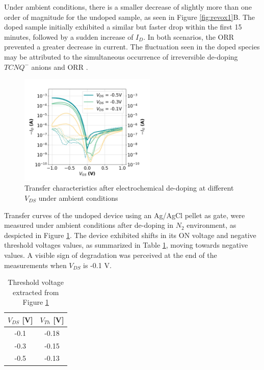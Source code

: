 Under ambient conditions, there is a smaller decrease of slightly more than one order of magnitude for the undoped sample, as seen in Figure \ref{fig:revox1}B. The doped sample initially exhibited a similar but faster drop within the first 15 minutes, followed by a sudden increase of $I_{D}$. In both scenarios, the ORR prevented a greater decrease in current. The fluctuation seen in the doped species may be attributed to the simultaneous occurrence of irreversible de-doping $TCNQ^{-}$ anions and ORR . %

\begin{figure}[ht]
    \centering
    \includegraphics[width=6.5cm]{Images/pdf/revox_transfer_loop2.pdf}%
    \caption[Transfer characteristics after electrochemical de-doping]{Transfer characteristics after electrochemical de-doping at different $V_{DS}$ under ambient conditions}
    \label{fig:transrevox1}
\end{figure}

Transfer curves of the undoped device using an Ag/AgCl pellet as gate, were measured under ambient conditions after de-doping in $N_{2}$ environment, as despicted in Figure \ref{fig:transrevox1}. The device exhibited shifts in its ON voltage and negative threshold voltages values, as summarized in Table \ref{tab:vth_air}, moving towards negative values. A visible sign of degradation was perceived at the end of the measurements when $V_{DS}$ is -0.1 V.

\begin{table}[ht]
\centering
\caption{Threshold voltage extracted from Figure \ref{fig:transrevox1}}
\begin{tabular}{c|c}
 $V_{DS}$ [V] & $V_{Th}$ [V] \\\hline
-0.1 & -0.18 \\
-0.3 & -0.15 \\
-0.5 & -0.13 \\ \hline
\end{tabular}
\label{tab:vth_air}
\end{table}

